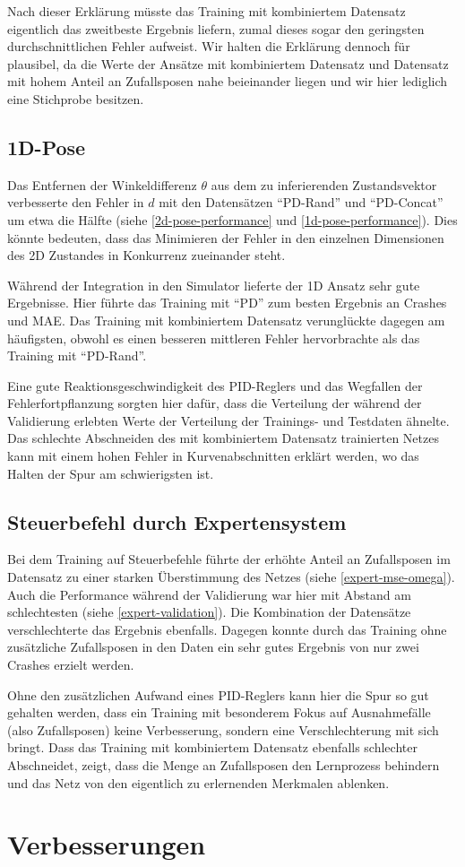 Nach dieser Erklärung müsste das Training mit kombiniertem Datensatz eigentlich das zweitbeste Ergebnis liefern, zumal dieses sogar den geringsten durchschnittlichen Fehler aufweist. Wir halten die Erklärung dennoch für plausibel, da die Werte der Ansätze mit kombiniertem Datensatz und Datensatz mit hohem Anteil an Zufallsposen nahe beieinander liegen und wir hier lediglich eine Stichprobe besitzen.

\subsection{1D-Pose}

Das Entfernen der Winkeldifferenz $\theta$ aus dem zu inferierenden Zustandsvektor verbesserte den Fehler in $d$ mit den Datensätzen ``PD-Rand'' und ``PD-Concat'' um etwa die Hälfte (siehe \ref{2d-pose-performance} und \ref{1d-pose-performance}). Dies könnte bedeuten, dass das Minimieren der Fehler in den einzelnen Dimensionen des 2D Zustandes in Konkurrenz zueinander steht.

Während der Integration in den Simulator lieferte der 1D Ansatz sehr gute Ergebnisse. Hier führte das Training mit ``PD'' zum besten Ergebnis an Crashes und MAE. Das Training mit kombiniertem Datensatz verunglückte dagegen am häufigsten, obwohl es einen besseren mittleren Fehler hervorbrachte als das Training mit ``PD-Rand''.

Eine gute Reaktionsgeschwindigkeit des PID-Reglers und das Wegfallen der Fehlerfortpflanzung sorgten hier dafür, dass die Verteilung der während der Validierung erlebten Werte der Verteilung der Trainings- und Testdaten ähnelte. Das schlechte Abschneiden des mit kombiniertem Datensatz trainierten Netzes kann mit einem hohen Fehler in Kurvenabschnitten erklärt werden, wo das Halten der Spur am schwierigsten ist.

\subsection{Steuerbefehl durch Expertensystem}

Bei dem Training auf Steuerbefehle führte der erhöhte Anteil an Zufallsposen im Datensatz zu einer starken Überstimmung des Netzes (siehe \ref{expert-mse-omega}). Auch die Performance während der Validierung war hier mit Abstand am schlechtesten (siehe \ref{expert-validation}).  Die Kombination der Datensätze verschlechterte das Ergebnis ebenfalls. Dagegen konnte durch das Training ohne zusätzliche Zufallsposen in den Daten ein sehr gutes Ergebnis von nur zwei Crashes erzielt werden.

Ohne den zusätzlichen Aufwand eines PID-Reglers kann hier die Spur so gut gehalten werden, dass ein Training mit besonderem Fokus auf Ausnahmefälle (also Zufallsposen) keine Verbesserung, sondern eine Verschlechterung mit sich bringt. Dass das Training mit kombiniertem Datensatz ebenfalls schlechter Abschneidet, zeigt, dass die Menge an Zufallsposen den Lernprozess behindern und das Netz von den eigentlich zu erlernenden Merkmalen ablenken.

\section{Verbesserungen}
